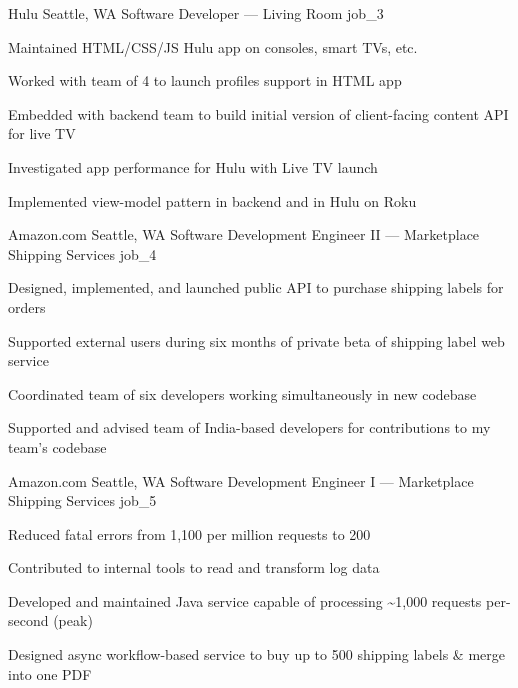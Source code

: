 \documentclass[10pt]{barag_resume}
\begin{document}
    \begin{job}{Hulu}
        {Seattle, WA}
        {Software Developer --- Living Room}
        {job_3}
            \begin{itemize*}
                \item Maintained HTML/CSS/JS Hulu app on consoles, smart TVs, etc.
                \item Worked with team of 4 to launch profiles support in HTML app
                \item Embedded with backend team to build initial version of client-facing content API for live TV
                \item Investigated app performance for Hulu with Live TV launch
                \item Implemented view-model pattern in backend and in Hulu on Roku
            \end{itemize*}
    \end{job}

    \begin{job}{Amazon.com}
        {Seattle, WA}
        {Software Development Engineer II --- Marketplace Shipping Services}
        {job_4}
            \begin{itemize*}
                \item Designed, implemented, and launched public API to purchase shipping labels for orders
                \item Supported external users during six months of private beta of shipping label web service
                \item Coordinated team of six developers working simultaneously in new codebase
                \item Supported and advised team of India-based developers for contributions to my team's codebase
            \end{itemize*}
    \end{job}

    \begin{job}{Amazon.com}
        {Seattle, WA}
        {Software Development Engineer I --- Marketplace Shipping Services}
        {job_5}
            \begin{itemize*}
                \item Reduced fatal errors from 1,100 per million requests to 200
                \item Contributed to internal tools to read and transform log data
                \item Developed and maintained Java service capable of processing \~{}1,000 requests per-second (peak)
                \item Designed async workflow-based service to buy up to 500 shipping labels \& merge into one PDF
            \end{itemize*}
    \end{job}
\end{document}
